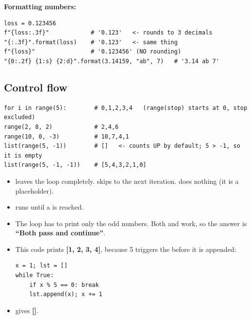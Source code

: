 \textbf{Formatting numbers:}
\begin{codebox}
\begin{Verbatim}
loss = 0.123456
f"{loss:.3f}"            # '0.123'   <- rounds to 3 decimals
"{:.3f}".format(loss)    # '0.123'   <- same thing
f"{loss}"                # '0.123456' (NO rounding)
"{0:.2f} {1:s} {2:d}".format(3.14159, "ab", 7)   # '3.14 ab 7'
\end{Verbatim}
\end{codebox}

\subsection{Control flow}
\begin{codebox}
\begin{Verbatim}
for i in range(5):        # 0,1,2,3,4   (range(stop) starts at 0, stop excluded)
range(2, 8, 2)            # 2,4,6
range(10, 0, -3)          # 10,7,4,1
list(range(5, -1))        # []   <- counts UP by default; 5 > -1, so it is empty
list(range(5, -1, -1))    # [5,4,3,2,1,0]
\end{Verbatim}
\end{codebox}
\begin{itemize}
  \item {} leaves the loop completely.  skips to the next iteration.  does nothing (it is a placeholder).
  \item {} runs until a  is reached.
\end{itemize}

\begin{exam}
\begin{itemize}
  \item The loop  has to print only the odd numbers. Both  and  work, so the answer is \textbf{``Both pass and continue''}.
  \item This code prints \textbf{[1, 2, 3, 4]}, because 5 triggers the  before it is appended:
\begin{Verbatim}
x = 1; lst = []
while True:
    if x % 5 == 0: break
    lst.append(x); x += 1
\end{Verbatim}
  \item {} gives \textbf{[]}.
\end{itemize}
\end{exam}

